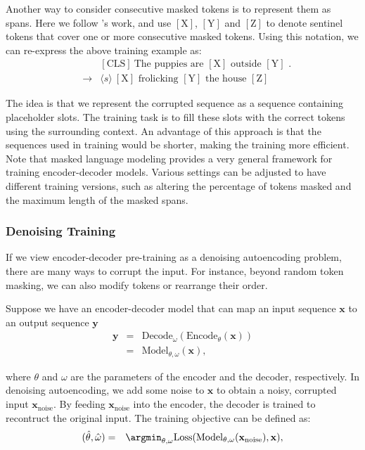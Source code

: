 Another way to consider consecutive masked tokens is to represent them as spans. Here we follow \citet{raffel-etal:2020exploring}'s work, and use $\mathrm{[X]}$, $\mathrm{[Y]}$ and $\mathrm{[Z]}$ to denote sentinel tokens that cover one or more consecutive masked tokens. Using this notation, we can re-express the above training example as:
\begin{eqnarray}
&     & \mathrm{[CLS]}\ \textrm{The puppies are $\mathrm{[X]}$ outside $\mathrm{[Y]}$ .} \nonumber \\
& \to & \langle s \rangle\ \textrm{$\mathrm{[X]}$ frolicking $\mathrm{[Y]}$ the house $\mathrm{[Z]}$} \nonumber
\end{eqnarray}

The idea is that we represent the corrupted sequence as a sequence containing placeholder slots. The training task is to fill these slots with the correct tokens using the surrounding context. An advantage of this approach is that the sequences used in training would be shorter, making the training more efficient. Note that masked language modeling provides a very general framework for training encoder-decoder models. Various settings can be adjusted to have different training versions, such as altering the percentage of tokens masked and the maximum length of the masked spans.

\subsubsection{Denoising Training}

\noindent If we view encoder-decoder pre-training as a denoising autoencoding problem, there are many ways to corrupt the input. For instance, beyond random token masking, we can also modify tokens or rearrange their order.

Suppose we have an encoder-decoder model that can map an input sequence $\mathbf{x}$ to an output sequence $\mathbf{y}$
\begin{eqnarray}
\mathbf{y} & = & \mathrm{Decode}_{\omega}(\mathrm{Encode}_{\theta}(\mathbf{x})) \nonumber \\
           & = & \mathrm{Model}_{\theta,\omega}(\mathbf{x}),
\end{eqnarray}

\noindent where $\theta$ and $\omega$ are the parameters of the encoder and the decoder, respectively. In denoising autoencoding, we add some noise to $\mathbf{x}$ to obtain a noisy, corrupted input $\mathbf{x}_{\mathrm{noise}}$. By feeding $\mathbf{x}_{\mathrm{noise}}$ into the encoder, the decoder is trained to recontruct the original input. The training objective can be defined as:
\begin{eqnarray}
(\hat{\theta},\hat{\omega}) & = & \argmin_{\theta,\omega} \mathrm{Loss}(\mathrm{Model}_{\theta,\omega}(\mathbf{x}_{\mathrm{noise}}),\mathbf{x}),
\end{eqnarray}

